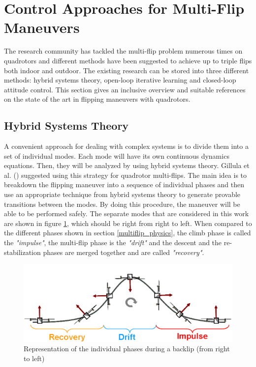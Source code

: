 \documentclass{thesisreport}
\begin{document}
 \section{Control Approaches for Multi-Flip Maneuvers}
 
The research community has tackled the multi-flip problem numerous times on quadrotors and different methods have been suggested to achieve up to triple flips both indoor and outdoor. The existing research can be stored into three different methods: hybrid systems theory, open-loop iterative learning and closed-loop attitude control. This section gives an inclusive overview and suitable references on the state of the art in flipping maneuvers with quadrotors.
  
 \subsection{Hybrid Systems Theory}
 
A convenient approach for dealing with complex systems is to divide them into a set of individual modes. Each mode will have its own continuous dynamics equations. Then, they will be analyzed by using hybrid systems theory. Gillula et al. (\cite{Gillula2011,Gillula2010}) suggested using this strategy for quadrotor multi-flips. The main idea is to breakdown the flipping maneuver into a sequence of individual phases and then use an appropriate technique from hybrid systems theory to generate provable transitions between the modes. By doing this procedure, the maneuver will be able to be performed safely. The separate modes that are considered in this work are shown in figure \ref{hybrid_systems_theory_figure}, which should be right from right to left. When compared to the different phases shown in section \ref{multiflip_physics}, the climb phase is called the \textit{"impulse"}, the multi-flip phase is the \textit{"drift"} and the descent and the re-stabilization phases are merged together and are called \textit{"recovery"}.
 
 \begin{figure}[h]
 \centering
 \includegraphics[width=\textwidth]{Images/Flip/Hybrid_Systems_Theory}
 \caption{Representation of the individual phases during a backlip (from right to left)\cite{Gillula2011}}
 \label{hybrid_systems_theory_figure}
 \end{figure}
\end{document}
